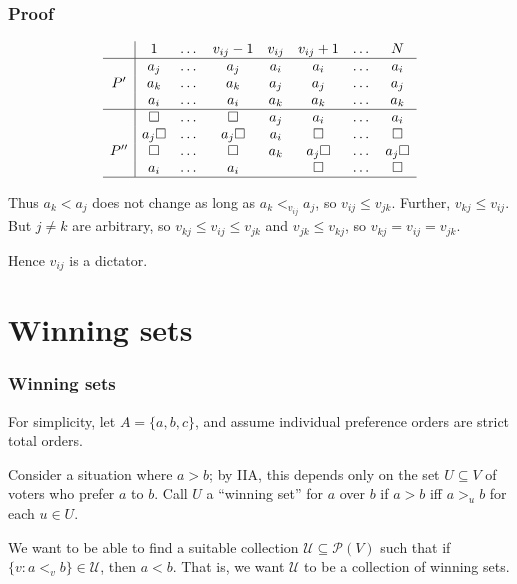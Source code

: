 \documentclass{beamer}
\theoremstyle{definition}
\begin{document}
\begin{frame}
    \frametitle{Proof}

    \[
        \begin{array}{c|ccccccc}
            & 1 & \dots & v_{ij}-1 & v_{ij} & v_{ij}+1 & \dots & N \\ \hline
            & a_j & \dots & a_j & a_i & a_i & \dots & a_i \\
           P' & a_k & \dots & a_k & a_j & a_j & \dots & a_j \\
            & a_i & \dots & a_i & a_k & a_k & \dots & a_k \\ \hline
            & \square & \dots & \square & a_j & a_i & \dots & a_i \\
            & a_j\square & \dots & a_j\square & a_i & \square & \dots & \square \\
           P'' & \square & \dots & \square & a_k & a_j\square & \dots & a_j\square \\
            & a_i & \dots & a_i & & \square & \dots & \square \\ \hline
        \end{array}  
    \]

    \pause
    Thus $a_k < a_j$ does not change as long as $a_k <_{v_{ij}} a_j$, so $v_{ij} \leq v_{jk}$. Further, $v_{kj} \leq v_{ij}$.
    \pause
    But $j \neq k$ are arbitrary, so $v_{kj} \leq v_{ij} \leq v_{jk}$ and $v_{jk} \leq v_{kj}$, so $v_{kj} = v_{ij} = v_{jk}$.

    \pause
    Hence $v_{ij}$ is a dictator. \hfill\qedsymbol
\end{frame}

\section{Winning sets}

\begin{frame}
    \frametitle{Winning sets}
    For simplicity, let $A = \{a, b, c\}$, and assume individual preference orders are strict total orders.
    
    \pause
    Consider a situation where $a > b$; by IIA, this depends only on the set $U \subseteq V$ of voters who prefer $a$ to $b$. Call $U$
    a ``winning set'' for $a$ over $b$ if $a > b$ iff $a >_u b$ for each $u \in U$.

    \pause
    We want to be able to find a suitable collection $\mathcal{U} \subseteq \mathcal{P}(V)$ such that if $\{v : a <_v b\} \in \mathcal{U}$,
    then $a < b$. That is, we want $\mathcal{U}$ to be a collection of winning sets.

\end{frame}
\end{document}

